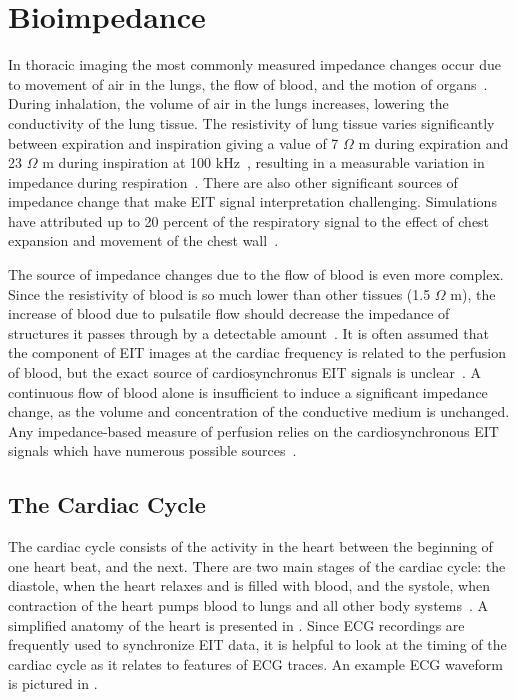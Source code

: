 \section{Bioimpedance}
\label{sec:bioimpedance}
In thoracic imaging the most commonly measured 
impedance changes occur due to movement 
of air in the lungs, the flow of blood, and the motion of 
organs~\parencite{adler_electrical_2017}. 
During inhalation, the volume of air in the lungs increases, lowering the 
conductivity of the lung tissue. 
The resistivity of lung tissue varies significantly
between expiration and inspiration giving a value of 7 $\Omega$ m during expiration
and 23 $\Omega$ m during inspiration at 100 kHz~\parencite{witsoe_electrical_1967},
resulting in a
measurable variation in impedance during respiration~\parencite{eyuboglu_vivo_1989}. 
There are also other 
significant sources of impedance change that make EIT signal interpretation 
challenging. Simulations have attributed up to 20
percent of the respiratory signal to the effect of 
chest expansion and movement of the chest 
wall~\parencite{adler_impedance_1994}.

The source of impedance changes due to the flow of blood is even more complex. 
Since the resistivity of blood is so much lower than other tissues 
(1.5 $\Omega$ m), the increase of blood due to pulsatile 
flow should decrease the impedance of structures it passes through 
by a detectable amount~\parencite{eyuboglu_vivo_1989}.
It is often assumed that the component of EIT images at the cardiac 
frequency is related to the perfusion of blood, but the exact source of
cardiosynchronus EIT signals is 
unclear~\parencite{patterson_impedance_2010,nguyen_review_2012}.
A continuous flow of blood alone is insufficient 
to induce a significant impedance change, 
as the volume and concentration of the conductive medium is unchanged. 
Any impedance-based measure of perfusion relies on the cardiosynchronous 
EIT signals which have numerous possible sources~\parencite{adler_origins_2017}. 

\subsection{The Cardiac Cycle}
The cardiac cycle consists of the activity in the heart between the
beginning of one heart beat, and the next. There are two main stages 
of the cardiac cycle: the diastole, when the heart relaxes and is filled 
with blood, and the systole, when contraction of the heart pumps blood to
lungs and all other body systems~\parencite{pappano_cardiovascular_2019}. 
A simplified anatomy of the heart is 
presented in . 
Since ECG recordings are frequently used to synchronize 
EIT data, it is helpful to look at the timing of the cardiac cycle as it 
relates to features of ECG traces. An example ECG waveform is pictured in 
. 

